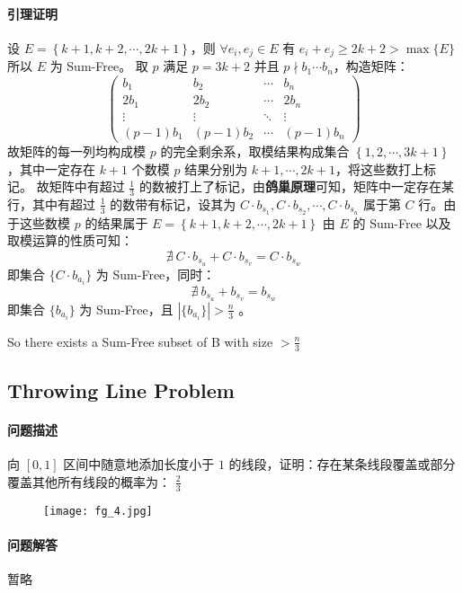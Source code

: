 		 \paragraph{引理证明}
		 设 $E = \left\{ k+1, k+2, \cdots , 2k+1 \right\} $，则 $\forall e_i, e_j \in E$ 有 $ e_i + e_j \ge 2k+2 > \max\{E\} $ 所以 $E$ 为 Sum-Free。
		\proof
	 	取 $p$ 满足 $p = 3k+2 $ 并且 $p \nmid b_1 \cdots b_n $，构造矩阵：
	 	$$ \left( \begin{array}{cccc}
						b_1 & b_2 & \cdots & b_n \\
						2b_1 & 2b_2 & \cdots & 2b_n \\
						\vdots & \vdots & \ddots & \vdots \\
						(p-1)b_1 & (p-1)b_2 & \cdots & (p-1)b_n
					\end{array}
					\right) $$
		故矩阵的每一列均构成模 $p$ 的完全剩余系，取模结果构成集合 $\left\{ 1,2, \cdots ,3k+1 \right\}$，其中一定存在 $k+1$ 个数模 $p$ 结果分别为 $k+1, \cdots ,2k+1$，将这些数打上标记。
		故矩阵中有超过 $\frac{1}{3}$ 的数被打上了标记，由\textbf{鸽巢原理}可知，矩阵中一定存在某行，其中有超过 $\frac{1}{3}$ 的数带有标记，设其为 $C \cdot b_{s_1}, C \cdot b_{s_2}, \cdots ,C \cdot b_{s_n}$ 属于第 $C$ 行。由于这些数模 $p$ 的结果属于 $E = \left\{ k+1, k+2, \cdots , 2k+1 \right\} $ 由 $E$ 的 Sum-Free 以及取模运算的性质可知：
		$$
			\nexists \  C \cdot b_{s_u} + C \cdot b_{s_v} = C \cdot b_{s_w}
		$$
		即集合 $\{ C \cdot b_{a_i} \}$ 为 Sum-Free，同时：
		$$
			\nexists \ b_{s_u} + b_{s_v} = b_{s_w}
		$$
		即集合 $\{b_{a_i}\}$ 为 Sum-Free，且 $| \{b_{a_i}\} | > \frac{n}{3}$ 。
		\par
		So there exists a Sum-Free subset of B with size $> \frac{n}{3}$

	\subsection{Throwing Line Problem}
		\paragraph{问题描述}
		   向 $\left[0, 1\right]$ 区间中随意地添加长度小于 $1$ 的线段，证明：存在某条线段覆盖或部分覆盖其他所有线段的概率为： $\frac{2}{3}$
		   \begin{figure}[htbp]
	   		\centering
	   		\texttt{[image: fg\_4.jpg]}
		   	\end{figure}
		\paragraph{问题解答}
		   暂略

